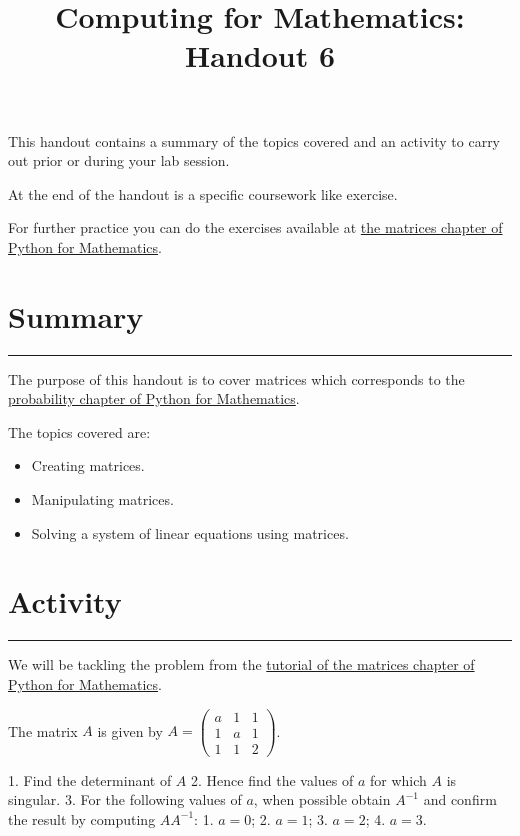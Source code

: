 \documentclass{article}
\title{Computing for Mathematics: Handout 6}
\date{}
\begin{document}
\maketitle


This handout contains a summary of the topics covered and an activity to
carry out prior or during your lab session.

At the end of the handout is a specific coursework like exercise.

For further practice you can do the exercises available at 
\href{https://vknight.org/pfm/tools-for-mathematics/04-matrices/introduction/main.html}{the
matrices chapter of Python for Mathematics}.

\section{Summary}\label{summary}
\hrule


The purpose of this handout is to cover matrices which
corresponds to the
\href{https://vknight.org/pfm/tools-for-mathematics/04-matrices/introduction/main.html}{probability
chapter of Python for Mathematics}.

The topics covered are:

\begin{itemize}
\item
  Creating matrices.
\item
  Manipulating matrices.
\item 
  Solving a system of linear equations using matrices.
\end{itemize}


\section{Activity}\label{activity}
\hrule

We will be tackling the problem from the
\href{https://vknight.org/pfm/tools-for-mathematics/04-matrices/tutorial/main.html}{tutorial
of the matrices chapter of Python for Mathematics}.

The matrix $A$ is given by $A=\begin{pmatrix}a & 1 & 1\\ 1 & a & 1\\ 1 & 1 & 2\end{pmatrix}$.

1. Find the determinant of $A$
2. Hence find the values of $a$ for which $A$ is singular.
3. For the following values of $a$, when possible obtain $A ^ {- 1}$ and confirm
   the result by computing $AA^{-1}$:
    1. $a = 0$;
    2. $a = 1$;
    3. $a = 2$;
    4. $a = 3$.
\end{document}
